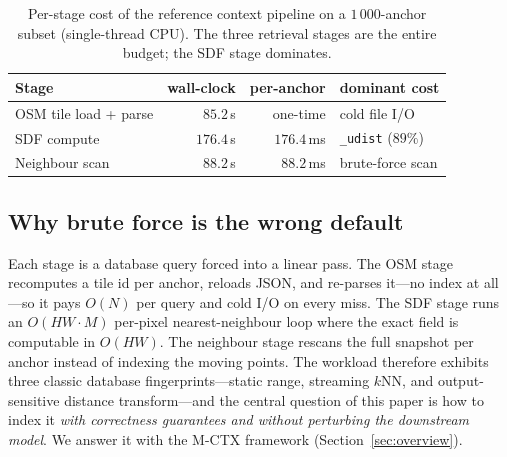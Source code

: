 \begin{table}[t]
\centering
\caption{Per-stage cost of the reference context pipeline on a
$1\,000$-anchor subset (single-thread CPU). The three retrieval stages
are the entire budget; the SDF stage dominates.}\label{tab:profile}
\small
\begin{tabular}{lrrl}
\toprule
Stage & wall-clock & per-anchor & dominant cost \\
\midrule
OSM tile load + parse & $85.2$\,s  & one-time   & cold file I/O \\
SDF compute           & $176.4$\,s & $176.4$\,ms & \texttt{\_udist} ($89\%$) \\
Neighbour scan        & $88.2$\,s  & $88.2$\,ms  & brute-force scan \\
\bottomrule
\end{tabular}
\end{table}

\subsection{Why brute force is the wrong default}
Each stage is a database query forced into a linear pass. The OSM stage
recomputes a tile id per anchor, reloads JSON, and re-parses it---no index
at all---so it pays $O(N)$ per query and cold I/O on every miss. The SDF
stage runs an $O(HW\!\cdot\!M)$ per-pixel nearest-neighbour loop where the
exact field is computable in $O(HW)$. The neighbour stage rescans the full
snapshot per anchor instead of indexing the moving points. The workload
therefore exhibits three classic database fingerprints---static range,
streaming $k$NN, and output-sensitive distance transform---and the central
question of this paper is how to index it \emph{with correctness
guarantees and without perturbing the downstream model}. We answer it with
the M-CTX framework (Section~\ref{sec:overview}).

